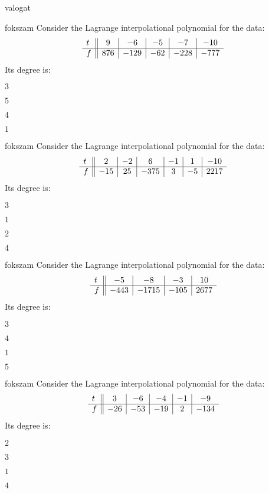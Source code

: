 \documentclass[12pt]{article}
\begin{document}
\begin{quiz}{valogat}
\begin{multi}{fokszam}
Consider the Lagrange interpolational polynomial for the data:
$$\begin{array}{l ||c|c|c|c|c}t&9&-6&-5&-7&-10\\ \hline f&876&-129&-62&-228&-777 \\ \end{array}$$
Its degree is:
\item* $ 3 $
\item  $ 5 $
\item  $ 4 $
\item  $ 1 $
\end{multi}
\begin{multi}{fokszam}
Consider the Lagrange interpolational polynomial for the data:
$$\begin{array}{l ||c|c|c|c|c|c}t&2&-2&6&-1&1&-10\\ \hline f&-15&25&-375&3&-5&2217 \\ \end{array}$$
Its degree is:
\item* $ 3 $
\item  $ 1 $
\item  $ 2 $
\item  $ 4 $
\end{multi}
\begin{multi}{fokszam}
Consider the Lagrange interpolational polynomial for the data:
$$\begin{array}{l ||c|c|c|c}t&-5&-8&-3&10\\ \hline f&-443&-1715&-105&2677 \\ \end{array}$$
Its degree is:
\item* $ 3 $
\item  $ 4 $
\item  $ 1 $
\item  $ 5 $
\end{multi}
\begin{multi}{fokszam}
Consider the Lagrange interpolational polynomial for the data:
$$\begin{array}{l ||c|c|c|c|c}t&3&-6&-4&-1&-9\\ \hline f&-26&-53&-19&2&-134 \\ \end{array}$$
Its degree is:
\item* $ 2 $
\item  $ 3 $
\item  $ 1 $
\item  $ 4 $

\end{multi}
\end{quiz}
\end{document}
